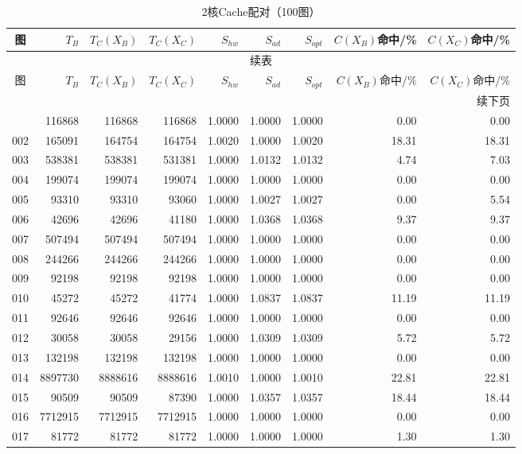 \begin{longtable}{crrrrrrrr}
\caption{2核Cache配对（100图）}\label{tab:cache-detail-2}\\
\toprule
图 & $T_B$ & $T_C(X_B)$ & $T_C(X_C)$ & $S_{hw}$ & $S_{ad}$ & $S_{opt}$ & $C(X_B)$命中/\% & $C(X_C)$命中/\% \\
\midrule
\endfirsthead
\multicolumn{9}{c}{续表}\\
\toprule
图 & $T_B$ & $T_C(X_B)$ & $T_C(X_C)$ & $S_{hw}$ & $S_{ad}$ & $S_{opt}$ & $C(X_B)$命中/\% & $C(X_C)$命中/\% \\
\midrule
\endhead
\midrule\multicolumn{9}{r}{续下页}\\
\endfoot
\bottomrule
\endlastfoot
001 & 116868 & 116868 & 116868 & 1.0000 & 1.0000 & 1.0000 & 0.00 & 0.00 \\
002 & 165091 & 164754 & 164754 & 1.0020 & 1.0000 & 1.0020 & 18.31 & 18.31 \\
003 & 538381 & 538381 & 531381 & 1.0000 & 1.0132 & 1.0132 & 4.74 & 7.03 \\
004 & 199074 & 199074 & 199074 & 1.0000 & 1.0000 & 1.0000 & 0.00 & 0.00 \\
005 & 93310 & 93310 & 93060 & 1.0000 & 1.0027 & 1.0027 & 0.00 & 5.54 \\
006 & 42696 & 42696 & 41180 & 1.0000 & 1.0368 & 1.0368 & 9.37 & 9.37 \\
007 & 507494 & 507494 & 507494 & 1.0000 & 1.0000 & 1.0000 & 0.00 & 0.00 \\
008 & 244266 & 244266 & 244266 & 1.0000 & 1.0000 & 1.0000 & 0.00 & 0.00 \\
009 & 92198 & 92198 & 92198 & 1.0000 & 1.0000 & 1.0000 & 0.00 & 0.00 \\
010 & 45272 & 45272 & 41774 & 1.0000 & 1.0837 & 1.0837 & 11.19 & 11.19 \\
011 & 92646 & 92646 & 92646 & 1.0000 & 1.0000 & 1.0000 & 0.00 & 0.00 \\
012 & 30058 & 30058 & 29156 & 1.0000 & 1.0309 & 1.0309 & 5.72 & 5.72 \\
013 & 132198 & 132198 & 132198 & 1.0000 & 1.0000 & 1.0000 & 0.00 & 0.00 \\
014 & 8897730 & 8888616 & 8888616 & 1.0010 & 1.0000 & 1.0010 & 22.81 & 22.81 \\
015 & 90509 & 90509 & 87390 & 1.0000 & 1.0357 & 1.0357 & 18.44 & 18.44 \\
016 & 7712915 & 7712915 & 7712915 & 1.0000 & 1.0000 & 1.0000 & 0.00 & 0.00 \\
017 & 81772 & 81772 & 81772 & 1.0000 & 1.0000 & 1.0000 & 1.30 & 1.30 \\

\end{longtable}
